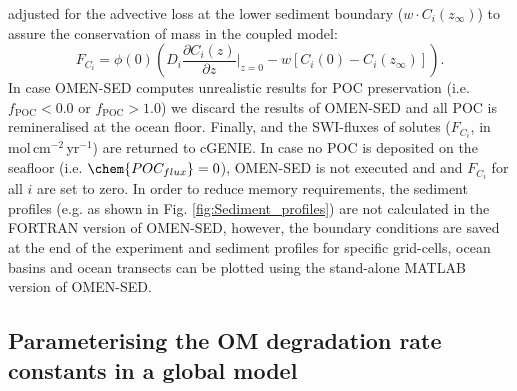 \documentclass[gmd, manuscript]{copernicus}
\begin{document}
adjusted for the advective loss at the lower sediment boundary ($w \cdot C_i(z_\infty)$) to assure the conservation of mass in the coupled model:
\begin{equation}
 F_{C_i} = \phi(0) \left(D_i \frac{\partial C_i(z)}{\partial z}\bigg\rvert_{z=0} - w \left[ C_i(0) - C_i(z_\infty) \right]\right).
\end{equation}
In case OMEN-SED computes unrealistic results for POC preservation (i.e. $f_{\mathrm{POC}} < 0.0$ or $f_{\mathrm{POC}} > 1.0$) we discard the results of OMEN-SED and all POC is remineralised at the ocean floor. 
Finally,  and the SWI-fluxes of solutes ($F_{C_i}$, in mol\,cm$^{-2}$\,yr$^{-1}$) are returned to cGENIE. 
In case no POC is deposited on the seafloor (i.e. $\chem{POC_{flux}}=0$), OMEN-SED is not executed and  and $F_{C_i}$ for all $i$ are set to zero. 
In order to reduce memory requirements, the sediment profiles (e.g. as shown in Fig. \ref{fig:Sediment_profiles}) are not calculated in the FORTRAN version of OMEN-SED, 
however, the boundary conditions are saved at the end of the experiment and sediment profiles for specific grid-cells, ocean basins and ocean transects can be plotted 
using the stand-alone MATLAB version of OMEN-SED.


\subsection{Parameterising the OM degradation rate constants in a global model}\label{subsec:Parameterising_OM_rate_const}
\end{document}
